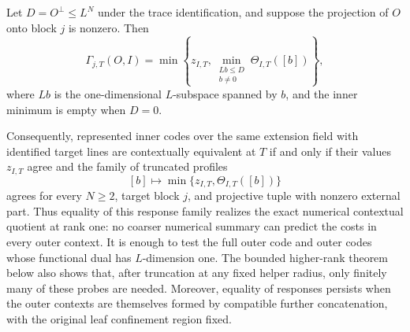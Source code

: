 \begin{theorem}
\label{thm:rank-one-contextual-state}
%
Let $D=O^\perp\leq L^N$ under the trace identification, and suppose the
projection of $O$ onto block $j$ is nonzero.  Then
\begin{equation}
 \Gamma_{j,T}(O,I)=
 \min\left\{
 z_{I,T},
 \min_{\substack{Lb\leq D\\b\ne0}}\Theta_{I,T}([b])
 \right\},
 \label{eq:rank-one-contextual-state}
\end{equation}
where $Lb$ is the one-dimensional $L$-subspace spanned by $b$, and the inner
minimum is empty when $D=0$.

Consequently, represented inner codes over the same extension field with
identified target lines are contextually equivalent at $T$ if and only if
their values $z_{I,T}$ agree and the family of truncated profiles
\[
 [b]\longmapsto\min\{z_{I,T},\Theta_{I,T}([b])\}
\]
agrees for every $N\geq2$, target block $j$, and projective tuple with nonzero
external part.  Thus equality of this response family realizes the exact
numerical contextual quotient at rank one: no coarser numerical summary can
predict the costs in every outer context.  It is enough to test the full outer
code and outer codes whose functional dual has $L$-dimension one.  The bounded
higher-rank theorem below also shows that, after truncation at any fixed helper
radius, only finitely many of these probes are needed.
Moreover, equality of responses persists when the outer contexts are themselves
formed by compatible further concatenation, with the original leaf confinement
region fixed.
\end{theorem}

